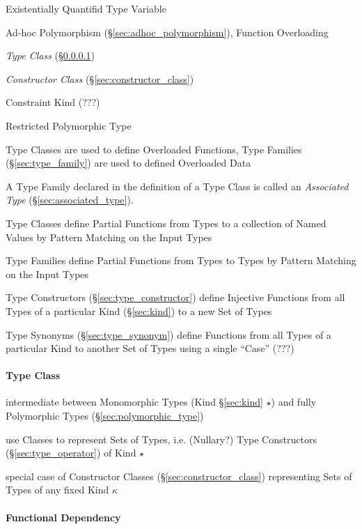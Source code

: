 Existentially Quantifid Type Variable

Ad-hoc Polymorphism (\S\ref{sec:adhoc_polymorphism}), Function
Overloading

\emph{Type Class} (\S\ref{sec:type_class})

\emph{Constructor Class} (\S\ref{sec:constructor_class})

Constraint Kind (???) %

Restricted Polymorphic Type %

Type Classes are used to define Overloaded Functions, Type Families
(\S\ref{sec:type_family}) are used to defined Overloaded Data

A Type Family declared in the definition of a Type Class is called an
\emph{Associated Type} (\S\ref{sec:associated_type}).

Type Classes define Partial Functions from Types to a collection of
Named Values by Pattern Matching on the Input Types

\fist Type Families define Partial Functions from Types to Types by
Pattern Matching on the Input Types

\fist Type Constructors (\S\ref{sec:type_constructor}) define
Injective Functions from all Types of a particular Kind
(\S\ref{sec:kind}) to a new Set of Types

\fist Type Synonyms (\S\ref{sec:type_synonym}) define Functions from
all Types of a particular Kind to another Set of Types using a single
``Case'' (???) %



\paragraph{Type Class}\label{sec:type_class}\hfill

\cite{jones95}

intermediate between Monomorphic Types (Kind \S\ref{sec:kind} $\star$)
and fully Polymorphic Types (\S\ref{sec:polymorphic_type})

use Classes to represent Sets of Types, i.e. (Nullary?) Type
Constructors (\S\ref{sec:type_operator}) of Kind $\star$

special case of Constructor Classes (\S\ref{sec:constructor_class})
representing Sets of Types of any fixed Kind $\kappa$



\paragraph{Functional Dependency}\label{sec:functional_dependency}\hfill

